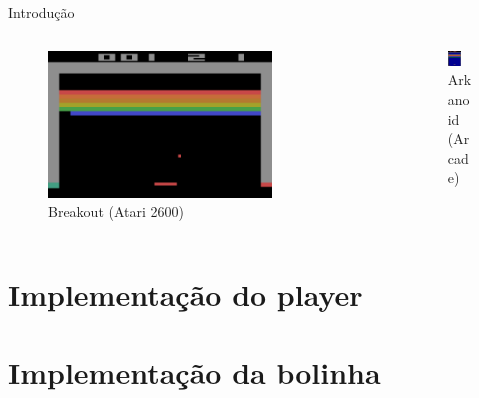 \documentclass{beamer}
\begin{document}
\begin{frame}[fragile]{Introdução}
\begin{columns}
	\begin{column}{0.5\textwidth}
		\begin{figure}
			\includegraphics[width=0.75\textwidth]{breakout.png}
			\caption{Breakout (Atari 2600)}
		\end{figure}
	\end{column}
	\begin{column}{0.5\textwidth}
		\begin{figure}
			\includegraphics[width=0.55\textwidth]{arkanoid.png}
			\caption{Arkanoid (Arcade)}
		\end{figure}	
	\end{column}	
\end{columns}
\end{frame}

\section{Implementação do player}
\section{Implementação da bolinha}
\end{document}
